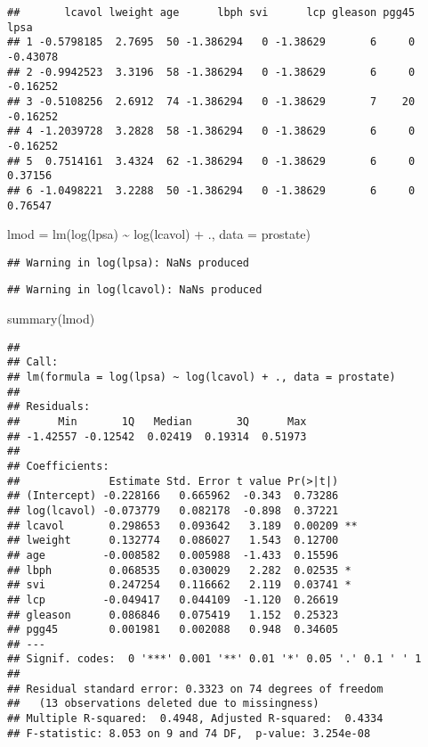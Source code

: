 \documentclass[
]{article}
\newenvironment{Shaded}{\begin{snugshade}}{\end{snugshade}}
\newcommand{\AttributeTok}[1]{\textcolor[rgb]{0.77,0.63,0.00}{#1}}
\newcommand{\FunctionTok}[1]{\textcolor[rgb]{0.00,0.00,0.00}{#1}}
\newcommand{\NormalTok}[1]{#1}
\newcommand{\OtherTok}[1]{\textcolor[rgb]{0.56,0.35,0.01}{#1}}
\newcommand{\SpecialCharTok}[1]{\textcolor[rgb]{0.00,0.00,0.00}{#1}}
\begin{document}
\begin{verbatim}
##       lcavol lweight age      lbph svi      lcp gleason pgg45     lpsa
## 1 -0.5798185  2.7695  50 -1.386294   0 -1.38629       6     0 -0.43078
## 2 -0.9942523  3.3196  58 -1.386294   0 -1.38629       6     0 -0.16252
## 3 -0.5108256  2.6912  74 -1.386294   0 -1.38629       7    20 -0.16252
## 4 -1.2039728  3.2828  58 -1.386294   0 -1.38629       6     0 -0.16252
## 5  0.7514161  3.4324  62 -1.386294   0 -1.38629       6     0  0.37156
## 6 -1.0498221  3.2288  50 -1.386294   0 -1.38629       6     0  0.76547
\end{verbatim}

\begin{Shaded}
\begin{Highlighting}[]
\NormalTok{lmod }\OtherTok{=} \FunctionTok{lm}\NormalTok{(}\FunctionTok{log}\NormalTok{(lpsa) }\SpecialCharTok{\textasciitilde{}} \FunctionTok{log}\NormalTok{(lcavol) }\SpecialCharTok{+}\NormalTok{ ., }\AttributeTok{data =}\NormalTok{ prostate)}
\end{Highlighting}
\end{Shaded}

\begin{verbatim}
## Warning in log(lpsa): NaNs produced
\end{verbatim}

\begin{verbatim}
## Warning in log(lcavol): NaNs produced
\end{verbatim}

\begin{Shaded}
\begin{Highlighting}[]
\FunctionTok{summary}\NormalTok{(lmod)}
\end{Highlighting}
\end{Shaded}

\begin{verbatim}
## 
## Call:
## lm(formula = log(lpsa) ~ log(lcavol) + ., data = prostate)
## 
## Residuals:
##      Min       1Q   Median       3Q      Max 
## -1.42557 -0.12542  0.02419  0.19314  0.51973 
## 
## Coefficients:
##              Estimate Std. Error t value Pr(>|t|)   
## (Intercept) -0.228166   0.665962  -0.343  0.73286   
## log(lcavol) -0.073779   0.082178  -0.898  0.37221   
## lcavol       0.298653   0.093642   3.189  0.00209 **
## lweight      0.132774   0.086027   1.543  0.12700   
## age         -0.008582   0.005988  -1.433  0.15596   
## lbph         0.068535   0.030029   2.282  0.02535 * 
## svi          0.247254   0.116662   2.119  0.03741 * 
## lcp         -0.049417   0.044109  -1.120  0.26619   
## gleason      0.086846   0.075419   1.152  0.25323   
## pgg45        0.001981   0.002088   0.948  0.34605   
## ---
## Signif. codes:  0 '***' 0.001 '**' 0.01 '*' 0.05 '.' 0.1 ' ' 1
## 
## Residual standard error: 0.3323 on 74 degrees of freedom
##   (13 observations deleted due to missingness)
## Multiple R-squared:  0.4948, Adjusted R-squared:  0.4334 
## F-statistic: 8.053 on 9 and 74 DF,  p-value: 3.254e-08
\end{verbatim}
\end{document}
